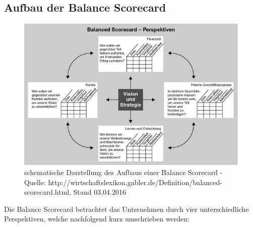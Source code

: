 \subsection{Aufbau der Balance Scorecard}
\begin{figure}[H]
\centering\includegraphics[width=1\textwidth]{img/bsc}
\caption[Aufbau einer Balance Scorecard]{schematische Darstellung des Aufbaus
einer Balance Scorecard - Quelle:
http://wirtschaftslexikon.gabler.de/Definition/balanced-scorecard.html,
Stand 03.04.2016}
\end{figure}
Die Balance Scorecard betrachtet das Unternehmen durch vier unterschiedliche
Perspektiven, welche nachfolgend kurz umschrieben werden:
